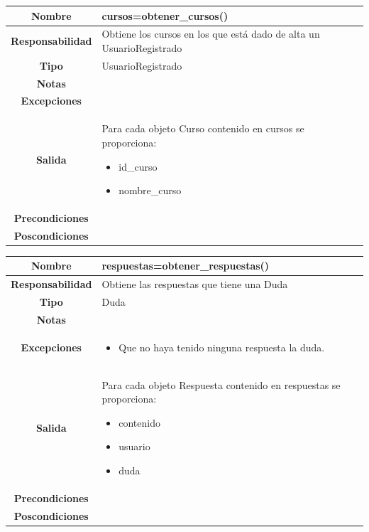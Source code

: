                        \begin{table}[!ht]
\begin{tabular}{|c|m{10cm}|}
\hline\rowcolor{Gray}
{\bf Nombre } & {cursos=obtener\_cursos()}\\
\hline
{\bf Responsabilidad } & {Obtiene los cursos en los que está dado de alta un UsuarioRegistrado}\\
\hline
\rowcolor{Gray}
{\bf Tipo } & {UsuarioRegistrado} \\
\hline
{\bf Notas } & { } \\
\hline
\rowcolor{Gray}
{\bf Excepciones }& {
} \\
\hline
{\bf Salida }& 
	  {
Para cada objeto Curso contenido en cursos se proporciona:	  
	   	\begin{itemize}
	  \item id\_curso
	  \item nombre\_curso
	    \end{itemize}
} 
 \\
\hline
\rowcolor{Gray}
{\bf Precondiciones }& {
}\\
\hline
{\bf Poscondiciones }& { }
  \\
\hline
\end{tabular}

\end{table}





                       \begin{table}[!ht]
\begin{tabular}{|c|m{10cm}|}
\hline\rowcolor{Gray}
{\bf Nombre } & {respuestas=obtener\_respuestas()}\\
\hline
{\bf Responsabilidad } & {Obtiene las respuestas que tiene una Duda}\\
\hline
\rowcolor{Gray}
{\bf Tipo } & {Duda} \\
\hline
{\bf Notas } & { } \\
\hline
\rowcolor{Gray}
{\bf Excepciones }& {
\begin{itemize}
\item Que no haya tenido ninguna respuesta la duda.
\end{itemize}
} \\
\hline
{\bf Salida }& 
	  {
Para cada objeto Respuesta contenido en respuestas se proporciona:	  
	   	\begin{itemize}
	  \item contenido
	  \item usuario
	  \item duda
	    \end{itemize}
} 
 \\
\hline
\rowcolor{Gray}
{\bf Precondiciones }& {
}\\
\hline
{\bf Poscondiciones }& { }
  \\
\hline
\end{tabular}

\end{table}






